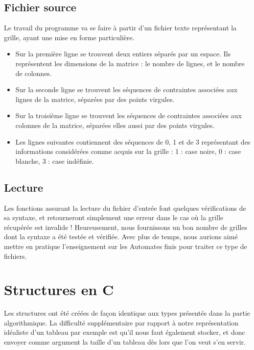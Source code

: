 \documentclass{report}
\begin{document}
\subsection{Fichier source}
Le travail du programme va se faire à partir d'un fichier texte représentant la grille, ayant une mise en forme particulière. 
\begin{itemize}
\item Sur la première ligne se trouvent deux entiers séparés par un espace. Ils représentent les dimensions de la matrice : le nombre de lignes, et le nombre de colonnes.

\item Sur la seconde ligne se trouvent les séquences de contraintes associées aux lignes de la matrice, séparées par des points virgules. 

\item Sur la troisième ligne se trouvent les séquences de contraintes associées aux colonnes de la matrice, séparées elles aussi par des points virgules. 

\item Les lignes suivantes contiennent des séquences de 0, 1 et de 3 représentant des informations considérées comme acquis sur la grille : 1 : case noire, 0 : case blanche, 3 : case indéfinie.
\end{itemize}

\subsection{Lecture}

Les fonctions assurant la lecture du fichier d'entrée font quelques vérifications de sa syntaxe, et retourneront simplement une erreur dans le cas où la grille récupérée est invalide ! Heureusement, nous fournissons un bon nombre de grilles dont la syntaxe a été testée et vérifiée. Avec plus de temps, nous aurions aimé mettre en pratique l'enseignement sur les Automates finis pour traiter ce type de fichiers.

\section{Structures en C}
Les structures ont été créées de façon identique aux types présentés dans la partie algorithmique. La difficulté supplémentaire par rapport à notre représentation idéaliste d'un tableau par exemple est qu'il nous faut également stocker, et donc envoyer comme argument la taille d'un tableau dès lors que l'on veut s'en servir.
\end{document}

